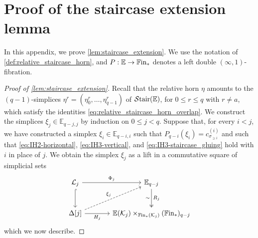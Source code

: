 \documentclass[10pt,reqno]{amsart}
\begin{document}
\appendix
\section{Proof of the staircase extension lemma}
\label{app:staircase_extension}

In this appendix, we prove \cref{lem:staircase_extension}. We use the
notation of \cref{def:relative_staircase_horn}, and
$P:\mathbb E\to\mathbb{F}\mathrm{in}_*$ denotes a left double
$(\infty,1)$-fibration.

\begin{proof}[Proof of \cref{lem:staircase_extension}]
Recall that the relative horn $\eta$ amounts to the
$(q-1)$-simplices $\eta^r=(\eta^r_0,\ldots,\eta^r_{q-1})$ of
$\mathcal{S}\mathrm{tair}(\mathbb E)$, for $0\leq r\leq q$ with $r\neq a$, which
satisfy the identities \eqref{eq:relative_staircase_horn_overlap}. We
construct the simplices $\xi_j\in\mathbb E_{q-j,j}$ by induction on
$0\leq j<q$. Suppose that, for every $i<j$, we have constructed a
simplex $\xi_i\in\mathbb E_{q-i,i}$ such that
$P_{q-i}(\xi_i)=c_{\sigma_{\geq i}}^{(i)}$ and such that
\eqref{eq:IH2-horizontal}, \eqref{eq:IH3-vertical}, and
\eqref{eq:IH3-staircase_gluing} hold with $i$ in place of $j$. We
obtain the simplex $\xi_j$ as a lift in a commutative square of
simplicial sets
\begin{equation}\label{eq:stage-j-square}
\begin{tikzcd}[sep=large]
  \mathcal L_j \ar[r,"\Phi_j"] \ar[d,hook] &
  \mathbb E_{q-j} \ar[d,two heads,"R_j","\sim"'] \\
  \Delta[j] \ar[r,"H_j"'] \ar[ru,dashed,"\xi_j"] &
  \mathbb E(\mathcal K_j)\times_{\bisimFin(\mathcal K_j)}(\bisimFin)_{q-j}
\end{tikzcd}
\end{equation}
which we now describe.


\end{proof}
\end{document}
